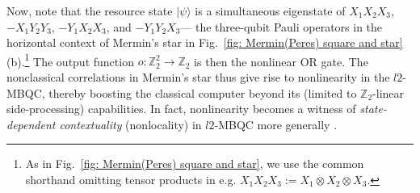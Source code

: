 \documentclass[aps,pra,letterpaper,onrcolumn,nofootinbib,notitlepage,longbibliography]{revtex4-1}
\newcommand{\zz}{\mathbb Z}
\begin{document}
Now, note that the resource state $|\psi\rangle$ is a simultaneous eigenstate of $X_1X_2X_3$, $-X_1Y_2Y_3$, $-Y_1X_2X_3$, and $-Y_1Y_2X_3$--- the three-qubit Pauli operators in the horizontal context of Mermin's star in Fig.~\ref{fig: Mermin(Peres) square and star} (b).\footnote{As in Fig.~\ref{fig: Mermin(Peres) square and star}, we use the common shorthand omitting tensor products in e.g. $X_1X_2X_3 := X_1 \otimes X_2 \otimes X_3$.} The output function $o: \zz_2^2 \rightarrow \zz_2$ is then the nonlinear OR gate. The nonclassical correlations in Mermin's star thus give rise to nonlinearity in the $l2$-MBQC, thereby boosting the classical computer beyond its (limited to $\zz_2$-linear side-processing) capabilities. In fact, nonlinearity becomes a witness of \emph{state-dependent contextuality} (nonlocality) in $l2$-MBQC more generally \cite{HobanCampbell2011,Raussendorf2013,FrembsRobertsBartlett2018,FrembsRobertsCampbellBartlett2022}.
\end{document}
